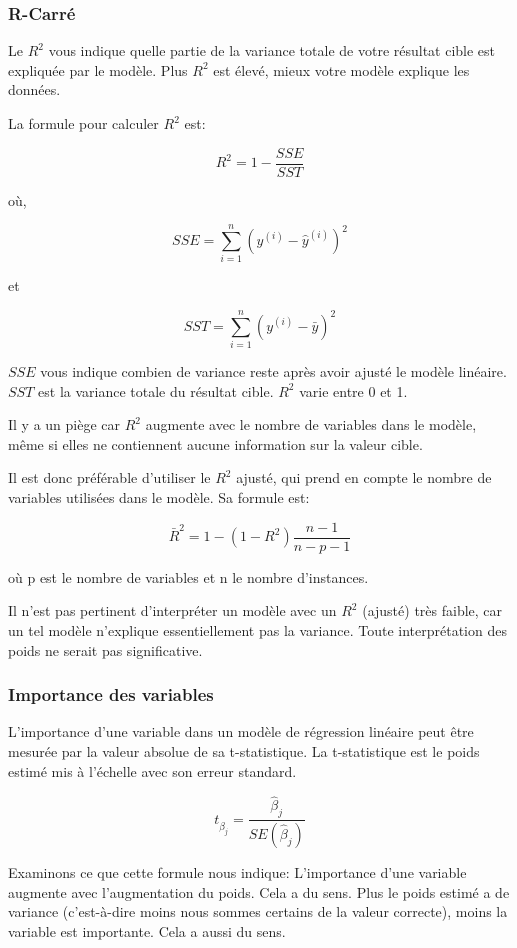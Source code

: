 \subsubsection{R-Carré}

Le \( R^2 \) vous indique quelle partie de la variance totale de votre résultat cible est expliquée par le modèle. Plus \( R^2 \) est élevé, mieux votre modèle explique les données.

La formule pour calculer \( R^2 \) est: 

\[
R^2 = 1 - \frac{SSE}{SST}
\]

où, 

\[
SSE = \sum_{i=1}^n (y^{(i)} - \hat{y}^{(i)})^2
\]

et

\[
SST = \sum_{i=1}^n (y^{(i)} - \bar{y})^2
\]

\( SSE \) vous indique combien de variance reste après avoir ajusté le modèle linéaire. \( SST \) est la variance totale du résultat cible. \( R^2 \) varie entre 0 et 1.

Il y a un piège car \( R^2 \) augmente avec le nombre de variables dans le modèle, même si elles ne contiennent aucune information sur la valeur cible. 

Il est donc préférable d'utiliser le \( R^2 \) ajusté, qui prend en compte le nombre de variables utilisées dans le modèle. Sa formule est: 

\[
\bar{R}^2 = 1 - (1 - R^2) \frac{n-1}{n-p-1}
\]

où p est le nombre de variables et n le nombre d'instances.

Il n'est pas pertinent d'interpréter un modèle avec un \( R^2 \) (ajusté) très faible, car un tel modèle n'explique essentiellement pas la variance. Toute interprétation des poids ne serait pas significative.

\subsubsection{Importance des variables}

L'importance d'une variable dans un modèle de régression linéaire peut être mesurée par la valeur absolue de sa t-statistique. La t-statistique est le poids estimé mis à l'échelle avec son erreur standard.

\[
t_{\hat{\beta}_j} = \frac{\hat{\beta}_j}{SE(\hat{\beta}_j)}
\]

Examinons ce que cette formule nous indique:
L'importance d'une variable augmente avec l'augmentation du poids.
Cela a du sens.
Plus le poids estimé a de variance (c'est-à-dire moins nous sommes certains de la valeur correcte), moins la variable est importante.
Cela a aussi du sens.

